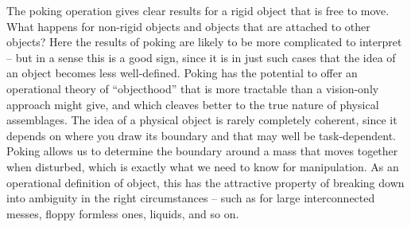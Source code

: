 The poking operation gives clear results for a rigid object that is
free to move.  What happens for non-rigid objects and objects that are
attached to other objects?  Here the results of poking are likely to
be more complicated to interpret -- but in a sense this is a good
sign, since it is in just such cases that the idea of an object
becomes less well-defined.  Poking has the potential to offer an
operational theory of ``objecthood'' that is more tractable than a
vision-only approach might give, and which cleaves better to the true
nature of physical assemblages.  The idea of a physical object is
rarely completely coherent, since it depends on where you draw its
boundary and that may well be task-dependent.  Poking allows us to
determine the boundary around a mass that moves together when
disturbed, which is exactly what we need to know for manipulation.  As
an operational definition of object, this has the attractive property
of breaking down into ambiguity in the right circumstances -- such
as for large interconnected messes, floppy formless ones, liquids,
and so on.


\ifverbose


\fi


